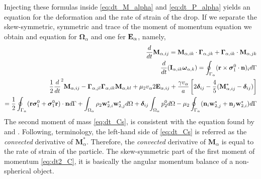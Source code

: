 Injecting these formulas inside \ref{eq:dt_M_alpha} and \ref{eq:dt_P_alpha} yields an equation for the deformation and the rate of strain of the drop. 
If we separate the skew-symmetric, symmetric and trace of the moment of momentum equation we obtain and equation for $\bm\Omega_\alpha$ and one fer  $\textbf E_\alpha$, namely,
\begin{align}
    \frac{d}{dt} \textbf{M}_{\alpha,ij}
    = \textbf{M}_{\alpha,ik} \cdot \bm\Gamma_{\alpha,jk}
    +  \bm\Gamma_{\alpha,ik} \cdot \textbf{M}_{\alpha,jk}
    \label{eq:dt_M}
    \\
    \frac{d}{dt} (\textbf{I}_{\alpha,ik}\bm\omega_{\alpha,k} )
    = 
    \oint_{\Gamma_{\alpha}} (\textbf{r}\times\bm\sigma_1^0\cdot \textbf{n})_i d\Gamma \\
    \frac{1}{2}\frac{d}{dt}^2 \textbf{M}_{\alpha,ij}
    -  \bm\Gamma_{\alpha,jl}\bm\Gamma_{\alpha,ik} \textbf{M}_{\alpha,kl}  
    + \mu_2 v_\alpha 2\textbf{E}_{\alpha,ij}
    + \frac{\gamma v_\alpha }{a} \left[
    2\bm\delta_{ij} 
    - \frac{4 }{5} (\textbf{M}_{\alpha,ij}^* - \bm\delta_{ij})
    \right]\\
    = 
    \frac{1}{2}\oint_{\Gamma_{\alpha}} (\textbf{r}\bm\sigma_1^0 + \bm\sigma_1^0\textbf{r})\cdot \textbf{n} d\Gamma 
    + \int_{\Omega_{\alpha}} \rho_2 \textbf{w}_{2,i}^s\textbf{w}_{2,j}^s d\Omega
    + \bm\delta_{ij}\int_{\Omega_{\alpha}} p_2^0 d\Omega 
    - \mu_2 \oint_{\Gamma_{\alpha}} (\textbf{n}_i \textbf{w}_{2,j}^s + \textbf{n}_j \textbf{w}_{2,i}^s) d\Gamma\\
\end{align}
The second moment of mass \ref{eq:dt_Cs}, is consistent with the equation found by \citet{goddard1967nonlinear} and \citet{lhuillier1987phenomenology}. 
Following, \citet{goddard1967nonlinear}  terminology, the left-hand side of \ref{eq:dt_Cs} is referred as the \textit{convected} derivative of $\textbf{M}^*_\alpha$. 
Therefore, the \textit{convected} derivative of $\textbf{M}_\alpha$ is equal to the rate of strain of the particle. 
The skew-symmetric part of the first moment of momentum \ref{eq:dt2_C}, it is basically the angular momentum balance of a non-spherical object. 
